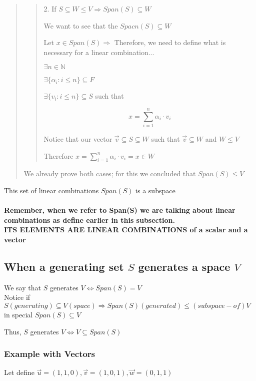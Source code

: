 \documentclass{article}
\begin{document}
\begin{quote}
\begin{quote}
    2. If \(S \subseteq W \leq V \Rightarrow Span(S) \subseteq W \)

    We want to see that the \(Spacn(S) \subseteq W\)

    Let \(x \in Span(S) \Rightarrow\) Therefore, we need to define what is necessary for a linear combination...

    \(\exists n \in \mathbb{N}\)

    \(\exists \{\alpha_i : i \leq n\} \subseteq F\)

    \(\exists \{v_i : i \leq n\} \subseteq S\) such that

    \[
    x = \sum_{i=1}^{n} \alpha_i \cdot v_i
    \]

    Notice that our vector \(\vec{v} \subseteq S \subseteq W\) such that \(\vec{v} \subseteq W\) and \(W\leq V\)

    Therefore \(x = \sum_{i=1}^{n} \alpha_i \cdot v_i = x \in W\)
    
\end{quote}

We already prove both cases; for this we concluded that \(Span(S)\leq V\)
\end{quote} 

This set of linear combinations \(Span(S)\) is a subspace
\\
\\
\textbf{Remember, when we refer to Span(S) we are talking about linear combinations as define earlier in this subsection.\\ITS ELEMENTS ARE LINEAR COMBINATIONS of a scalar and a vector} 

\subsection*{When a generating set \(S\) generates a space \(V\)}

We say that \(S\) generates \(V \iff Span(S)=V\)
\\
Notice if \(S(generating) \subseteq V(space) \Rightarrow Span(S)(generated) \leq(subspace-of) V \) in special \(Span(S) \subseteq V\)

Thus, \(S\) generates \(V \iff V \subseteq Span(S)\)

\subsubsection*{Example with Vectors}

Let define \(\vec{u} = (1,1,0), \vec{v} = (1,0,1), \vec{w}= (0,1,1)\)
\end{document}
